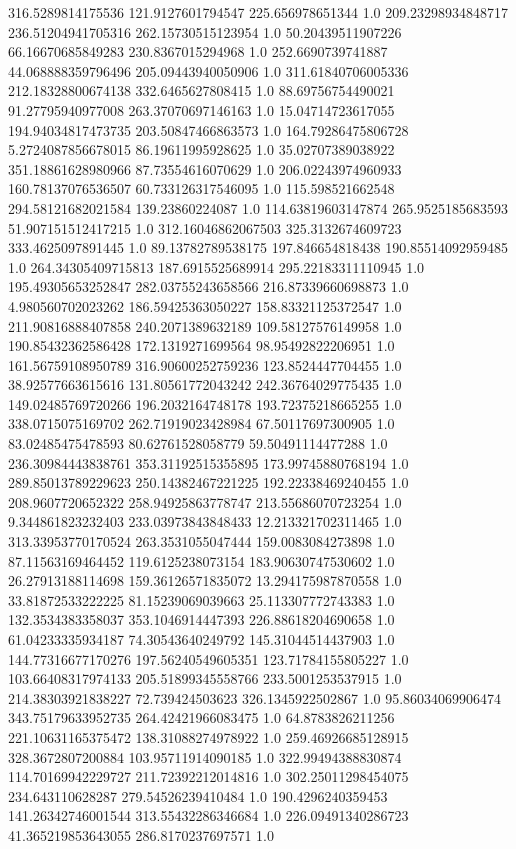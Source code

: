 316.5289814175536	121.9127601794547	225.656978651344	1.0
209.23298934848717	236.51204941705316	262.15730515123954	1.0
50.20439511907226	66.16670685849283	230.8367015294968	1.0
252.6690739741887	44.068888359796496	205.09443940050906	1.0
311.61840706005336	212.18328800674138	332.6465627808415	1.0
88.69756754490021	91.27795940977008	263.37070697146163	1.0
15.04714723617055	194.94034817473735	203.50847466863573	1.0
164.79286475806728	5.2724087856678015	86.19611995928625	1.0
35.02707389038922	351.18861628980966	87.73554616070629	1.0
206.02243974960933	160.78137076536507	60.733126317546095	1.0
115.598521662548	294.58121682021584	139.23860224087	1.0
114.63819603147874	265.9525185683593	51.907151512417215	1.0
312.16046862067503	325.3132674609723	333.4625097891445	1.0
89.13782789538175	197.846654818438	190.85514092959485	1.0
264.34305409715813	187.6915525689914	295.22183311110945	1.0
195.49305653252847	282.03755243658566	216.87339660698873	1.0
4.980560702023262	186.59425363050227	158.83321125372547	1.0
211.90816888407858	240.2071389632189	109.58127576149958	1.0
190.85432362586428	172.1319271699564	98.95492822206951	1.0
161.56759108950789	316.90600252759236	123.8524447704455	1.0
38.92577663615616	131.80561772043242	242.36764029775435	1.0
149.02485769720266	196.2032164748178	193.72375218665255	1.0
338.0715075169702	262.71919023428984	67.50117697300905	1.0
83.02485475478593	80.62761528058779	59.50491114477288	1.0
236.30984443838761	353.31192515355895	173.99745880768194	1.0
289.85013789229623	250.14382467221225	192.22338469240455	1.0
208.9607720652322	258.94925863778747	213.55686070723254	1.0
9.344861823232403	233.03973843848433	12.213321702311465	1.0
313.33953770170524	263.3531055047444	159.0083084273898	1.0
87.11563169464452	119.6125238073154	183.90630747530602	1.0
26.27913188114698	159.36126571835072	13.294175987870558	1.0
33.81872533222225	81.15239069039663	25.113307772743383	1.0
132.3534383358037	353.1046914447393	226.88618204690658	1.0
61.04233335934187	74.30543640249792	145.31044514437903	1.0
144.77316677170276	197.56240549605351	123.71784155805227	1.0
103.66408317974133	205.51899345558766	233.5001253537915	1.0
214.38303921838227	72.739424503623	326.1345922502867	1.0
95.86034069906474	343.75179633952735	264.42421966083475	1.0
64.8783826211256	221.10631165375472	138.31088274978922	1.0
259.46926685128915	328.3672807200884	103.95711914090185	1.0
322.99494388830874	114.70169942229727	211.72392212014816	1.0
302.25011298454075	234.643110628287	279.54526239410484	1.0
190.4296240359453	141.26342746001544	313.55432286346684	1.0
226.09491340286723	41.365219853643055	286.8170237697571	1.0
